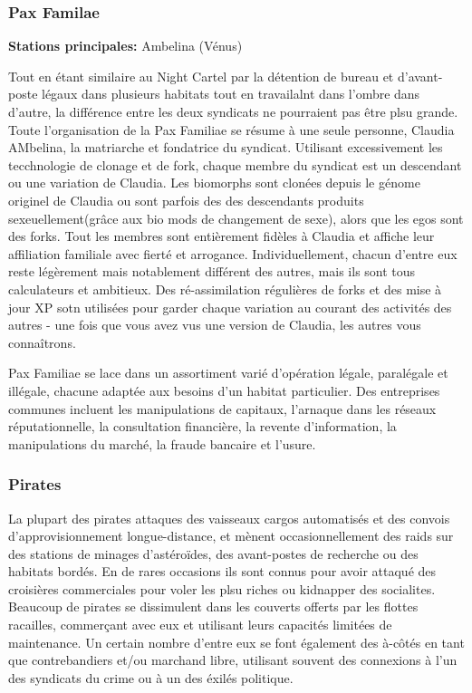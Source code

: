                                              \subsubsection{Pax Familae} \label{sec:pax-familae} 

                                             \textbf{Stations principales:} Ambelina (Vénus) 

                                             Tout en étant similaire au Night Cartel par la détention de bureau et d'avant-poste légaux dans plusieurs habitats tout en travailalnt dans l'ombre dans d'autre, la différence entre les deux syndicats ne pourraient pas être plsu grande. Toute l'organisation de la Pax Familiae se résume à une seule personne, Claudia AMbelina, la matriarche et fondatrice du syndicat. Utilisant excessivement les tecchnologie de  clonage et de fork, chaque membre du syndicat est un descendant ou une variation de Claudia. Les biomorphs sont clonées depuis le génome originel de Claudia ou sont parfois des des descendants produits sexeuellement(grâce aux bio mods de changement de sexe), alors que les egos sont des forks. Tout les membres sont entièrement fidèles à Claudia et affiche leur affiliation familiale avec fierté et arrogance. Individuellement, chacun d'entre eux reste légèrement mais notablement différent des autres, mais ils sont tous calculateurs et ambitieux. Des ré-assimilation régulières de forks et des mise à jour XP sotn utilisées pour garder chaque variation au courant des activités des autres - une fois que vous avez vus une version de Claudia, les autres vous connaîtrons. 

                                             Pax Familiae se lace dans un assortiment varié d'opération légale, paralégale et illégale, chacune adaptée aux besoins d'un habitat particulier. Des entreprises communes incluent les manipulations de capitaux, l'arnaque dans les réseaux réputationnelle, la consultation financière, la revente d'information, la manipulations du marché, la fraude bancaire et l'usure. 

                                             \subsubsection{Pirates} \label{sec:pirates} 

                                             La plupart des pirates attaques des vaisseaux cargos automatisés et des convois d'approvisionnement longue-distance, et mènent occasionnellement des raids sur des stations de minages d'astéroïdes, des avant-postes de recherche ou des habitats bordés. En de rares occasions ils sont connus pour avoir attaqué des croisières commerciales pour voler les plsu riches ou kidnapper des socialites. Beaucoup de pirates se dissimulent dans les couverts offerts par les flottes racailles, commerçant avec eux et utilisant leurs capacités limitées de maintenance. Un certain nombre d'entre eux se font également des à-côtés en tant que contrebandiers et/ou marchand libre, utilisant souvent des connexions à l'un des syndicats du crime ou à un des éxilés politique. 

